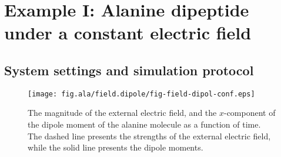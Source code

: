 \documentclass[aip,jcp,a4paper,preprint,onecolumn]{revtex4-1}
\begin{document}

\section{Example I: Alanine dipeptide
  under a constant electric field}

\subsection{System settings and simulation protocol}
\begin{figure}
  \centering
  \texttt{[image: fig.ala/field.dipole/fig-field-dipol-conf.eps]}
  \caption{The magnitude of the external electric field, and the
    $x$-component of the dipole moment of the alanine molecule as a
    function of time. The dashed line presents the strengths of the
    external electric field, while the solid line presents the dipole
    moments. }
  \label{fig:tmp3}
\end{figure}
\end{document}
